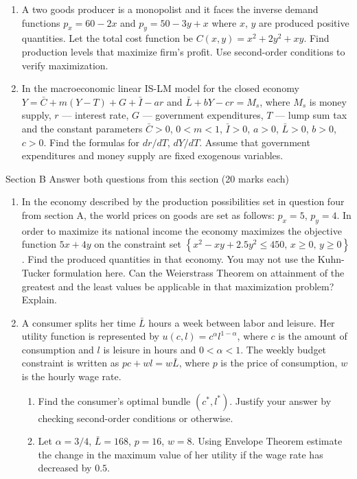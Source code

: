 \documentclass[12pt]{article} %
\theoremstyle{definition} %
\begin{document}
\begin{enumerate}
\item A two goods producer is a monopolist and it faces the inverse demand functions $p_x=60-2x$ and $p_y=50-3y+x$ where $x$, $y$ are produced positive quantities. Let the total cost function be $C(x,y)=x^2+2y^2+xy$. Find production levels that maximize firm’s profit. Use second-order conditions to verify maximization.

\item In the macroeconomic linear IS-LM model for the closed economy
$Y=\bar{C}+m(Y-T)+G+\bar{I}-ar$ and $\bar{L}+bY-cr=M_s$, where $M_s$ is money supply, $r$ --- interest rate, $G$ --- government expenditures, $T$ --- lump sum tax and the constant parameters $\bar{C}>0$, $0<m<1$, $\bar{I}>0$, $a>0$, $\bar{L}>0$, $b>0$, $c>0$. Find the formulas for $dr/dT$, $dY/dT$. Assume that government expenditures and money supply are fixed exogenous variables.
\end{enumerate}


Section B
Answer both questions from this section (20 marks each)

\begin{enumerate}[resume]
\item In the economy described by the production possibilities set in question four from section A, the world prices on goods are set as follows: $p_x=5$, $p_y=4$. In order to maximize its national income the economy maximizes the objective function $5x+4y$ on the constraint set
$ \left\{ x^2-xy+2.5y^2\leq 450, \, x\geq 0, \, y\geq 0 \right\} $.
Find the produced quantities in that economy. You may not use the Kuhn-Tucker formulation here. Can the Weierstrass Theorem on attainment of the greatest and the least values be applicable in that maximization problem? Explain.

\item A consumer splits her time $\bar{L}$ hours a week between labor and leisure. Her utility function is represented by $u(c,l)=c^{\alpha}l^{1-\alpha}$, where $c$ is the amount of consumption and $l$ is leisure in hours and $0<\alpha<1$. The weekly budget constraint is written as $pc+wl=w\bar{L}$,
where $p$ is the price of consumption, $w$ is the hourly wage rate.
\begin{enumerate}
\item Find the consumer’s optimal bundle $(c^*,l^*)$. Justify your answer by checking second-order conditions or otherwise.
\item Let $\alpha=3/4$, $\bar{L}=168$, $p=16$, $w=8$. Using Envelope Theorem estimate the change in the maximum value of her utility if the wage rate has decreased by $0.5$.
\end{enumerate}
\end{enumerate}
\end{document}
